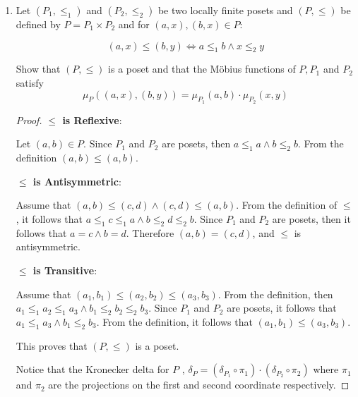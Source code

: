 \documentclass[12pt]{article}
\begin{document}
\begin{enumerate}
    Compute all values $\mu(x,y)$ for $x,y \in P$
    \begin{proof}
        
    
    $\mu(n,n) = 1, \mu(1,4) = \mu(2,4) = \mu (3,4) = \mu(0,1) = \mu(0,2) = \mu(0,3) = -1$
    
    Also notice that $\delta(0,4) = 0 = \displaystyle \sum \limits_{z \in [0,4]}\mu(z,4) = \mu(0,4)-3+1$ this implies that $\mu(0,4) = 2$
    
    $\mu(n,m) = 0 $ in all the remaining cases.
    \end{proof}
    \item Let $(P_1, \leq _1)$ and $(P_2, \leq_2)$ be two locally finite posets and $(P, \leq)$ be defined by $P = P_1 \times P_2$ and for $(a,x),(b,x) \in P:$
    
    $$ (a,x) \leq (b,y) \Leftrightarrow a \leq_1 b \wedge x \leq_2 y$$
    
    Show that $(P, \leq)$ is a poset and that the Möbius functions of $P,P_1$ and $P_2$ satisfy $$\mu_P((a,x),(b,y)) = \mu_{P_1}(a,b) \cdot \mu_{P_2}(x,y)$$
    
    \begin{proof}
    
        \textbf{ $\leq$ is Reflexive}:
        
        Let $(a,b) \in P$. Since $P_1$ and $P_2$ are posets, then $a\leq_1 a \wedge b \leq_2 b$. From the definition $(a,b) \leq (a,b)$.
        
        \textbf{ $\leq$ is Antisymmetric}:
        
        Assume that $(a,b) \leq (c,d) \wedge (c,d) \leq (a,b)$. From the definition of $\leq$, it follows that $a \leq_1 c \leq_1 a \wedge b \leq_2 d \leq_2 b$. Since $P_1$ and $P_2$ are posets, then it follows that $a=c \wedge b=d$. Therefore $(a,b) = (c,d)$, and $\leq $ is antisymmetric.
        
        \textbf{ $\leq$ is Transitive}:
        
        Assume that $(a_1,b_1) \leq (a_2,b_2) \leq (a_3,b_3)$. From the definition, then $a_1 \leq_1 a_2 \leq_1 a_3 \wedge b_1 \leq_2 b_2 \leq_2 b_3$. Since $P_1$ and $P_2$ are posets, it follows that $a_1 \leq_1 a_3 \wedge b_1 \leq_2 b_3.$ From the definition, it follows that $(a_1,b_1) \leq (a_3,b_3)$.
        
        This proves that $(P,\leq) $ is a poset.
        
        Notice that the Kronecker delta for $P $ , $\delta_P = (\delta_{P_1} \circ \pi_1) \cdot (\delta_{P_2} \circ \pi_2)$ where $\pi_1$ and $\pi_2$ are the projections on the first and second coordinate respectively.
        

\end{proof}
\end{enumerate}
\end{document}
